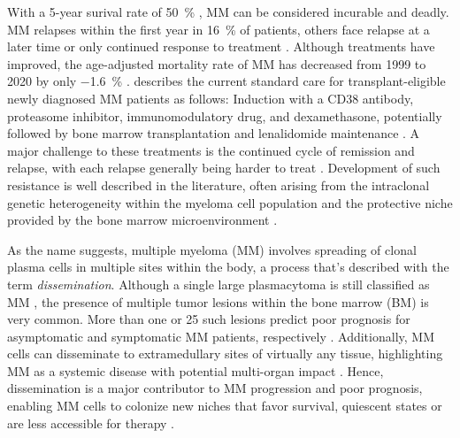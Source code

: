 With a 5-year surival rate of \SI{50}{\percent}
\cite{turessonRapidlyChangingMyeloma2018}, MM can be considered incurable and
deadly. MM relapses within the first year in \SI{16}{\percent} of patients,
others face relapse at a later time or only continued response to treatment
\cite{majithiaEarlyRelapseFollowing2016}. Although treatments have improved, the
age-adjusted mortality rate of MM has decreased from 1999 to 2020 by only
\SI{-1.6}{\percent} \cite{doddiDisparitiesMultipleMyeloma2024}.
\citet{engelhardtFunctionalCureLongterm2024} describes the current standard care
for transplant-eligible newly diagnosed MM patients as follows: Induction with a
CD38 antibody, proteasome inhibitor, immunomodulatory drug, and dexamethasone,
potentially followed by bone marrow transplantation and lenalidomide maintenance
\cite{rajkumarMultipleMyelomaCurrent2020}. A major challenge to these treatments
is the continued cycle of remission and relapse, with each relapse generally
being harder to treat \cite{podarRelapsedRefractoryMultiple2021}. Development of
such resistance is well described in the literature, often arising from the
intraclonal genetic heterogeneity within the myeloma cell population and the
protective niche provided by the bone marrow microenvironment
\cite{solimandoDrugResistanceMultiple2022}.



%
\label{sec:intro_myeloma_dissemination}%
As the name suggests, multiple myeloma (MM) involves spreading of clonal plasma
cells in multiple sites within the body, a process that's described with the
term \emph{dissemination}. Although a single large plasmacytoma is still
classified as MM \cite{rajkumarInternationalMyelomaWorking2014}, the presence of
multiple tumor lesions within the bone marrow (BM) is very common. More than one
or 25 such lesions predict poor prognosis for asymptomatic and symptomatic MM
patients, respectively \cite{kastritisPrognosticImportancePresence2014,
    maiMagneticResonanceImagingbased2015a}. Additionally, MM cells can disseminate
to extramedullary sites of virtually any tissue, highlighting MM as a systemic
disease with potential multi-organ impact
\cite{rajkumarMultipleMyelomaCurrent2020,
    bladeExtramedullaryDiseaseMultiple2022}. Hence, dissemination is a major
contributor to MM progression and poor prognosis, enabling MM cells to
colonize new niches that favor survival, quiescent states or are less accessible
for therapy \cite{forsterMolecularImpactTumor2022}.

